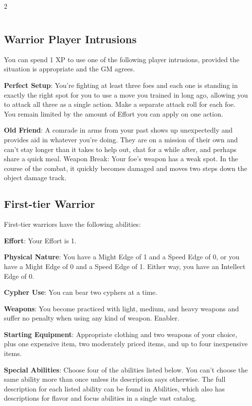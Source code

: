 \begin{multicols}{2}
\begin{table}
\begin{tabularx}{\textwidth}{| p{} | p{} |}
\end{tabularx}

\end{table}

\subsection{Warrior Player Intrusions}

You can spend 1 XP to use one of the following player intrusions, provided the situation is appropriate and the GM agrees.

\textbf{Perfect Setup}: You’re fighting at least three foes and each one is standing in exactly the right spot for you to use a move you trained in long ago, allowing you to attack all three as a single action. Make a separate attack roll for each foe. You remain limited by the amount of Effort you can apply on one action.

\textbf{Old Friend}: A comrade in arms from your past shows up unexpectedly and provides aid in whatever you’re doing. They are on a mission of their own and can’t stay longer than it takes to help out, chat for a while after, and perhaps share a quick meal.
Weapon Break: Your foe’s weapon has a weak spot. In the course of the combat, it quickly becomes damaged and moves two steps down the object damage track.

\subsection{First-tier Warrior}

First-tier warriors have the following abilities:

\textbf{Effort}: Your Effort is 1.

\textbf{Physical Nature}: You have a Might Edge of 1 and a Speed Edge of 0, or you have a Might Edge of 0 and a Speed Edge of 1. Either way, you have an Intellect Edge of 0.

\textbf{Cypher Use}: You can bear two cyphers at a time.

\textbf{Weapons}: You become practiced with light, medium, and heavy weapons and suffer no penalty when using any kind of weapon. Enabler.

\textbf{Starting Equipment}: Appropriate clothing and two weapons of your choice, plus one expensive item, two moderately priced items, and up to four inexpensive items.

\textbf{Special Abilities}: Choose four of the abilities listed below. You can’t choose the same ability more than once unless its description says otherwise. The full description for each listed ability can be found in Abilities, which also has descriptions for flavor and focus abilities in a single vast catalog.


\end{multicols}
